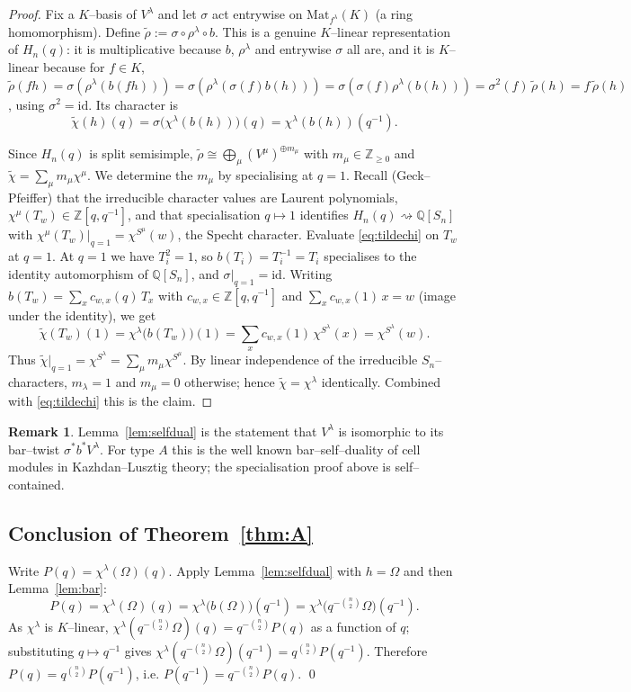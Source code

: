 \documentclass[11pt]{article}
\theoremstyle{definition}
\newtheorem{remark}[theorem]{Remark}
\newcommand{\Hn}{H_n(q)}
\newcommand{\qinv}{q^{-1}}
\begin{document}
\begin{proof}
Fix a $K$--basis of $V^\lambda$ and let $\sigma$ act entrywise on
$\mathrm{Mat}_{f^\lambda}(K)$ (a ring homomorphism). Define
$\tilde\rho:=\sigma\circ\rho^\lambda\circ b$. This is a genuine $K$--linear
representation of $\Hn$: it is multiplicative because $b$, $\rho^\lambda$ and
entrywise $\sigma$ all are, and it is $K$--linear because for $f\in K$,
$\tilde\rho(fh)=\sigma(\rho^\lambda(b(fh)))=\sigma(\rho^\lambda(\sigma(f)b(h)))
=\sigma(\sigma(f)\rho^\lambda(b(h)))=\sigma^2(f)\,\tilde\rho(h)=f\,\tilde\rho(h)$,
using $\sigma^2=\mathrm{id}$. Its character is
\begin{equation}\label{eq:tildechi}
\tilde\chi(h)(q)=\sigma\big(\chi^\lambda(b(h))\big)(q)=\chi^\lambda(b(h))(\qinv).
\end{equation}

Since $\Hn$ is split semisimple, $\tilde\rho\cong\bigoplus_\mu (V^\mu)^{\oplus
m_\mu}$ with $m_\mu\in\mathbb Z_{\ge0}$ and
$\tilde\chi=\sum_\mu m_\mu\chi^\mu$. We determine the $m_\mu$ by
specialising at $q=1$. Recall (Geck--Pfeiffer) that the irreducible character
values are Laurent polynomials, $\chi^\mu(T_w)\in\mathbb Z[q,\qinv]$, and that
specialisation $q\mapsto1$ identifies $\Hn\rightsquigarrow\mathbb Q[S_n]$ with
$\chi^\mu(T_w)|_{q=1}=\chi^{S^\mu}(w)$, the Specht character. Evaluate
\eqref{eq:tildechi} on $T_w$ at $q=1$. At $q=1$ we have $T_i^2=1$, so
$b(T_i)=T_i^{-1}=T_i$ specialises to the identity automorphism of
$\mathbb Q[S_n]$, and $\sigma|_{q=1}=\mathrm{id}$. Writing
$b(T_w)=\sum_x c_{w,x}(q)\,T_x$ with $c_{w,x}\in\mathbb Z[q,\qinv]$ and
$\sum_x c_{w,x}(1)\,x=w$ (image under the identity), we get
\[
\tilde\chi(T_w)(1)=\chi^\lambda\!\big(b(T_w)\big)(1)
=\sum_x c_{w,x}(1)\,\chi^{S^\lambda}(x)=\chi^{S^\lambda}(w).
\]
Thus $\tilde\chi|_{q=1}=\chi^{S^\lambda}=\sum_\mu m_\mu\chi^{S^\mu}$. By linear
independence of the irreducible $S_n$--characters, $m_\lambda=1$ and
$m_\mu=0$ otherwise; hence $\tilde\chi=\chi^\lambda$ identically. Combined with
\eqref{eq:tildechi} this is the claim.
\end{proof}

\begin{remark}
Lemma~\ref{lem:selfdual} is the statement that $V^\lambda$ is isomorphic to
its bar--twist $\sigma^*b^*V^\lambda$. For type $A$ this is the well known
bar--self--duality of cell modules in Kazhdan--Lusztig theory; the
specialisation proof above is self--contained.
\end{remark}

\subsection{Conclusion of Theorem~\ref{thm:A}}
Write $P(q)=\chi^\lambda(\Omega)(q)$. Apply Lemma~\ref{lem:selfdual} with
$h=\Omega$ and then Lemma~\ref{lem:bar}:
\[
P(q)=\chi^\lambda(\Omega)(q)
=\chi^\lambda\!\big(b(\Omega)\big)(\qinv)
=\chi^\lambda\!\big(q^{-\binom n2}\Omega\big)(\qinv).
\]
As $\chi^\lambda$ is $K$--linear, $\chi^\lambda(q^{-\binom n2}\Omega)(q)=
q^{-\binom n2}P(q)$ as a function of $q$; substituting $q\mapsto\qinv$ gives
$\chi^\lambda(q^{-\binom n2}\Omega)(\qinv)=q^{\binom n2}P(\qinv)$. Therefore
$P(q)=q^{\binom n2}P(\qinv)$, i.e.
$P(\qinv)=q^{-\binom n2}P(q)$. \qed
\end{document}
